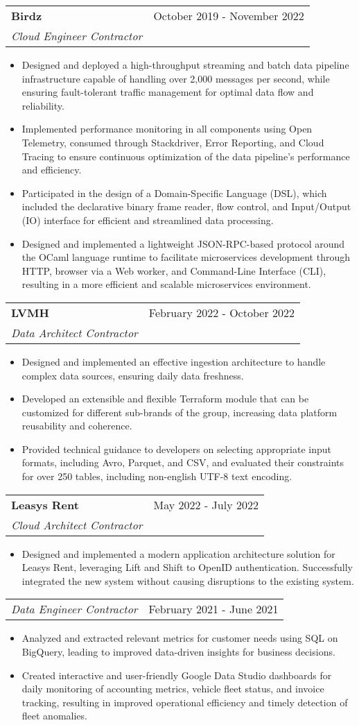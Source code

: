 \documentclass[letterpaper,11pt]{article}
\makeatletter
\newcommand{\resumeItem}[1]{
  \item\small{#1 \vspace{-2pt}}
}
\newcommand{\resumeSubheading}[3]{
  \vspace{-1pt}\item
    \begin{tabular*}{0.97\textwidth}[t]{l@{\extracolsep{\fill}}r}
      \textbf{#1} & #2 \\
      \textit{\small #3} \\
    \end{tabular*}\vspace{-5pt}
}
\newcommand{\resumeSubSubheading}[2]{
  \begin{tabular*}{0.97\textwidth}{l@{\extracolsep{\fill}}r}
    \textit{\small#1} & \small #2 \\
  \end{tabular*}\vspace{-5pt}
}
\newcommand{\resumeItemListStart}{\begin{itemize}}
\newcommand{\resumeItemListEnd}{\end{itemize}\vspace{-5pt}}
\makeatother
\begin{document}
\resumeSubheading{Birdz}
{October 2019 - November 2022}
{Cloud Engineer Contractor}
\resumeItemListStart{}
\resumeItem{
	Designed and deployed a high-throughput streaming and batch data pipeline
	infrastructure capable of handling over 2,000 messages per second, while ensuring
	fault-tolerant traffic management for optimal data flow and reliability.
}
\resumeItem{
	Implemented performance monitoring in all components using Open Telemetry,
	consumed through Stackdriver, Error Reporting, and Cloud Tracing to ensure
	continuous optimization of the data pipeline's performance and efficiency.
}
\resumeItem{
	Participated in the design of a Domain-Specific Language (DSL), which included the
	declarative binary frame reader, flow control, and Input/Output (IO) interface
	for efficient and streamlined data processing.
}
\resumeItem{
	Designed and implemented a lightweight JSON-RPC-based protocol around the
	OCaml language runtime to facilitate microservices development through HTTP,
	browser via a Web worker, and Command-Line Interface (CLI), resulting in a more
	efficient and scalable microservices environment.
}
\resumeItemListEnd{}


\resumeSubheading{LVMH}
{February 2022 - October 2022}
{Data Architect Contractor}
\resumeItemListStart{}
\resumeItem{
	Designed and implemented an effective ingestion architecture to handle complex
	data sources, ensuring daily data freshness.
}
\resumeItem{
	Developed an extensible and flexible Terraform module that can be customized for
	different sub-brands of the group, increasing data platform reusability and
	coherence.
}
\resumeItem{
	Provided technical guidance to developers on selecting appropriate input formats,
	including Avro, Parquet, and CSV, and evaluated their constraints for over 250
	tables, including non-english UTF-8 text encoding.
}
\resumeItemListEnd{}


\resumeSubheading{Leasys Rent}
{May 2022 - July 2022}
{Cloud Architect Contractor}
\resumeItemListStart{}
\resumeItem{
	Designed and implemented a modern application architecture solution for Leasys Rent,
	leveraging Lift and Shift to OpenID authentication. Successfully integrated the
	new system without causing disruptions to the existing system.
}
\resumeItemListEnd{}


\resumeSubSubheading{Data Engineer Contractor}
{February 2021 - June 2021}
\resumeItemListStart{}
\resumeItem{
	Analyzed and extracted relevant metrics for customer needs using SQL on
	BigQuery, leading to improved data-driven insights for business decisions.
}
\resumeItem{
	Created interactive and user-friendly Google Data Studio dashboards for daily
	monitoring of accounting metrics, vehicle fleet status, and invoice tracking,
	resulting in improved operational efficiency and timely detection of fleet
	anomalies.
}
\resumeItemListEnd{}
\end{document}

